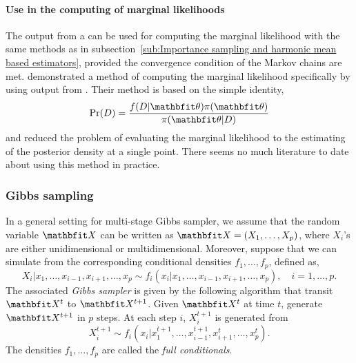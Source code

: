 \paragraph{Use in the computing of marginal likelihoods} The output from a
\mha can be used for computing the marginal likelihood with the same methods
as in subsection~\ref{sub:Importance sampling and harmonic mean based
  estimators}, provided the convergence condition of the Markov chains are
met. \textcite{Chib2001} demonstrated a method of computing the marginal
likelihood specifically by using output from \mha. Their method is based on
the simple identity,
\begin{equation}
  \Pr(D) = \frac{f(D|\bth)\pi(\bth)}{\pi(\bth|D)}
\end{equation}
and reduced the problem of evaluating the marginal likelihood to the
estimating of the posterior density at a single point. There seems no much
literature to date about using this method in practice.

\subsubsection{Gibbs sampling}
\label{ssub:Gibbs sampling}

In a general setting for multi-stage Gibbs sampler, we assume that the random
variable $\bfX$ can be written as $\bfX=(X_1,\dots,X_p)$, where $X_i$'s are
either unidimensional or multidimensional. Moreover, suppose that we can
simulate from the corresponding conditional densities $f_1,\dots,f_p$, defined
as,
\begin{equation}
  X_i|x_1,\dots,x_{i-1},x_{i+1},\dots,x_p
  \sim f_i(x_i|x_1,\dots,x_{i-1},x_{i+1},\dots,x_p),\quad i = 1,\dots,p.
\end{equation}
The associated \emph{Gibbs sampler} is given by the following algorithm that
transit $\bfX^t$ to $\bfX^{t+1}$. Given $\bfX^t$ at time $t$, generate
$\bfX^{t+1}$ in $p$ steps. At each step $i$, $X_i^{t+1}$ is generated from
\begin{equation}
  X_i^{t+1} \sim f_i(x_i|x_1^{t+1},\dots,x_{i-1}^{t+1},x_{i+1}^t,\dots,x_p^t).
\end{equation}
The densities $f_1,\dots,f_p$ are called the \emph{full conditionals}.

